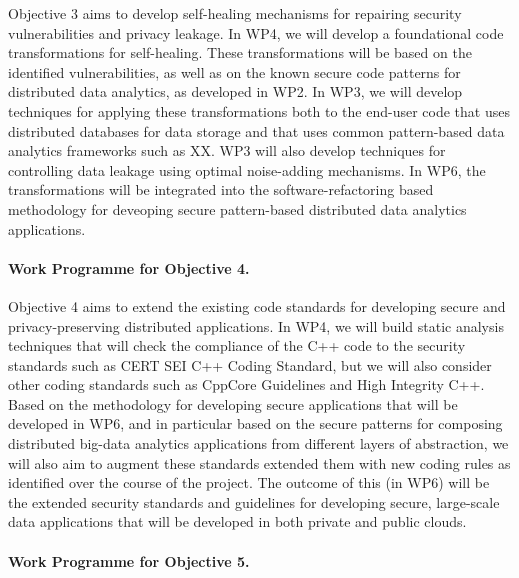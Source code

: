 \documentclass[a4paper,11pt]{article}
\begin{document}
Objective 3 aims to develop self-healing mechanisms for repairing security vulnerabilities and privacy leakage. In WP4, we will develop a foundational code transformations for self-healing. These transformations will be based on the identified vulnerabilities, as well as on the known secure code patterns for distributed data analytics, as developed in WP2. In WP3, we will develop techniques for applying these transformations both to the end-user code that uses distributed databases for data storage and that uses common pattern-based data analytics frameworks such as XX. WP3 will also develop techniques for controlling data leakage using optimal noise-adding mechanisms. In WP6, the transformations will be integrated into the software-refactoring based methodology for deveoping secure pattern-based distributed data analytics applications. 

\paragraph{Work Programme for Objective 4.}

Objective 4 aims to extend the existing code standards for developing secure and privacy-preserving distributed applications. In WP4, we will build static analysis techniques that will check the compliance of the C++ code to the security standards such as CERT SEI C++ Coding Standard, but we will also consider other coding standards such as CppCore Guidelines and High Integrity C++. Based on the methodology for developing secure applications that will be developed in WP6, and in particular based on the secure patterns for composing distributed big-data analytics applications from different layers of abstraction, we will also aim to augment these standards extended them with new coding rules as identified over the course of the project. The outcome of this (in WP6) will be the extended security standards and guidelines for developing secure, large-scale data applications that will be developed in both private and public clouds.

\paragraph{Work Programme for Objective 5.}
\end{document}
